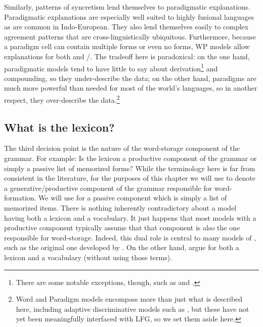 \documentclass[output=paper,hidelinks]{langscibook}
\begin{document}
    Similarly, patterns of syncretism lend themselves to
    paradigmatic explanations. Paradigmatic explanations are
    especially well suited to highly fusional languages as are common
    in Indo-European.  They also lend themselves easily to complex
    agreement patterns that are cross-linguistically ubiquitous.
    Furthermore, because a paradigm cell can contain multiple forms or
    even no forms, WP models allow explanations for both
     and /.
    The tradeoff here is paradoxical: on the one hand, paradigmatic
    models tend to have little to say about derivation\footnote{There
      are some notable exceptions, though, such as \textcite{Booij2010}
      and \citet{spencer13}.}  and compounding, so they under-describe
    the data; on the other hand, paradigms are much more powerful than
    needed for most of the world’s languages, so in another respect,
    they over-describe the data.\footnote{Word and Paradigm models
      encompass more than just what is described here, including
      adaptive discriminative models such as \citet{blevins;ea16}, but
      these have not yet been meaningfully interfaced with LFG, so we
      set them aside here.}
  
\subsection{What is the lexicon?}\largerpage[2]

The third decision point is the nature of the word-storage component
of the grammar.  For example: Is the lexicon a productive component of
the grammar or simply a passive list of memorized forms?  While the
terminology here is far from consistent in the literature, for the
purposes of this chapter we will use  to denote a generative/productive
component of the grammar responsible for word-formation.  We will use
 for a passive component which is simply a list of memorized
items.  There is nothing inherently contradictory about a model having
both a lexicon and a vocabulary.  It just happens that most models
with a productive component typically assume that that component is
also the one responsible for word-storage.  Indeed, this dual role is
central to many models of , such as the original one developed
by \citet{aronoff76}.  On the other hand, \citet{disciullo:word}
argue for both a lexicon and a vocabulary (without using those
terms). 
\end{document}
